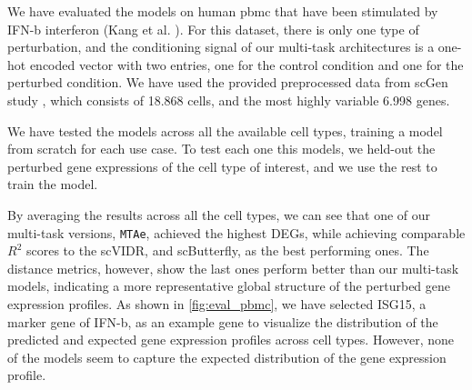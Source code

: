 \documentclass[12pt, a4paper]{article}
\begin{document}
We have evaluated the models on human \gls{pbmc} that have been stimulated by IFN-b interferon (Kang et al. \cite{kanaGenerativeModelingSinglecell2023}). For this dataset, there is only one type of perturbation, and the conditioning signal of our multi-task architectures is a one-hot encoded vector with two entries, one for the control condition and one for the perturbed condition. We have used the provided preprocessed data from scGen study \cite{lotfollahiScGenPredictsSinglecell2019}, which consists of 18.868 cells, and the most highly variable 6.998 genes.

We have tested the models across all the available cell types, training a model from scratch for each use case. To test each one this models, we held-out the perturbed gene expressions of the cell type of interest, and we use the rest to train the model. 

By averaging the results across all the cell types, we can see that one of our multi-task versions, \verb|MTAe|, achieved the highest DEGs, while achieving comparable $R^2$ scores to the scVIDR, and scButterfly, as the best performing ones. The distance metrics, however, show the last ones perform better than our multi-task models, indicating a more representative global structure of the perturbed gene expression profiles. As shown in \cref{fig:eval_pbmc}, we have selected ISG15, a marker gene of IFN-b, as an example gene to visualize the distribution of the predicted and expected gene expression profiles across cell types. However, none of the models seem to capture the expected distribution of the gene expression profile.


\end{document}
